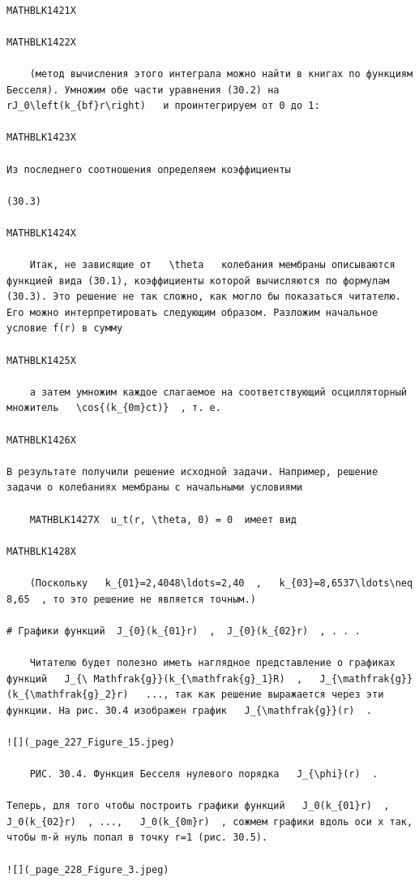 \documentclass[
]{article}
\begin{document}
\begin{verbatim}

MATHBLK1421X

MATHBLK1422X

    (метод вычисления этого интеграла можно найти в книгах по функциям Бесселя). Умножим обе части уравнения (30.2) на   rJ_0\left(k_{bf}r\right)   и проинтегрируем от 0 до 1:

MATHBLK1423X

Из последнего соотношения определяем коэффициенты

(30.3)

MATHBLK1424X

    Итак, не зависящие от   \theta   колебания мембраны описываются функцией вида (30.1), коэффициенты которой вычисляются по формулам (30.3). Это решение не так сложно, как могло бы показаться читателю. Его можно интерпретировать следующим образом. Разложим начальное условие f(r) в сумму

MATHBLK1425X

    а затем умножим каждое слагаемое на соответствующий осцилляторный множитель   \cos{(k_{0m}ct)}  , т. е.

MATHBLK1426X

В результате получили решение исходной задачи. Например, решение задачи о колебаниях мембраны с начальными условиями

    MATHBLK1427X  u_t(r, \theta, 0) = 0  имеет вид

MATHBLK1428X

    (Поскольку   k_{01}=2,4048\ldots=2,40  ,   k_{03}=8,6537\ldots\neq 8,65  , то это решение не является точным.)

# Графики функций  J_{0}(k_{01}r)  ,  J_{0}(k_{02}r)  , . . .

    Читателю будет полезно иметь наглядное представление о графиках функций   J_{\ Mathfrak{g}}(k_{\mathfrak{g}_1}R)  ,   J_{\mathfrak{g}}(k_{\mathfrak{g}_2}r)   ..., так как решение выражается через эти функции. На рис. 30.4 изображен график   J_{\mathfrak{g}}(r)  .

![](_page_227_Figure_15.jpeg)

    РИС. 30.4. Функция Бесселя нулевого порядка   J_{\phi}(r)  .

Теперь, для того чтобы построить графики функций   J_0(k_{01}r)  ,   J_0(k_{02}r)  , ...,   J_0(k_{0m}r)  , сожмем графики вдоль оси x так, чтобы m-й нуль попал в точку r=1 (рис. 30.5).

![](_page_228_Figure_3.jpeg)


\end{verbatim}
\end{document}
